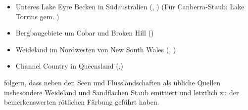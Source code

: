 \documentclass[12pt,a4paper,onecolumn]{scrartcl}
\begin{document}
\begin{itemize}
\item Unteres Lake Eyre Becken in Südaustralien (\cite{Leys.2011}, \cite{Leys.2009}) (Für Canberra-Staub: Lake Torrins gem. \cite{Deckker.2014})
\item Bergbaugebiete um Cobar und Broken Hill  (\cite{Leys.2011})
\item Weideland im Nordwesten von New South Wales (\cite{Leys.2011}, \cite{Leys.2009})
\item Channel Country in Queensland (\cite{Leys.2011},\cite{Leys.2009})
\end{itemize}
\citet{Leys.2011} folgern, dass neben den Seen und Flusslandschaften als übliche Quellen insbesondere Weideland und Sandflächen Staub emittiert und letztlich zu der bemerkenswerten rötlichen Färbung geführt haben.
\end{document}
